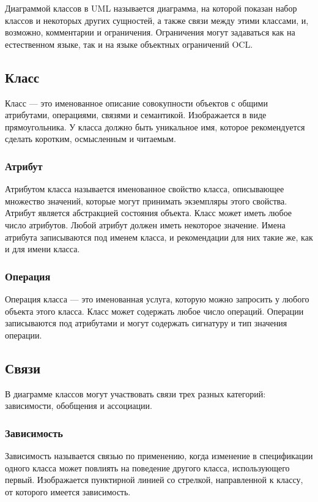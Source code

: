 \documentclass[a4paper,12pt]{article}
\begin{document}
Диаграммой классов в UML называется диаграмма, на которой показан набор классов и некоторых других сущностей, а также связи между этими классами, и, возможно, комментарии и ограничения. Ограничения могут задаваться как на естественном языке, так и на языке объектных ограничений OCL.

\subsection{Класс}

Класс — это именованное описание совокупности объектов с общими атрибутами, операциями, связями и семантикой. Изображается в виде прямоугольника. У класса должно быть уникальное имя, которое рекомендуется сделать коротким, осмысленным и читаемым.

\subsubsection{Атрибут}

Атрибутом класса называется именованное свойство класса, описывающее множество значений, которые могут принимать экземпляры этого свойства. Атрибут является абстракцией состояния объекта. Класс может иметь любое число атрибутов. Любой атрибут должен иметь некоторое значение. Имена атрибута записываются под именем класса, и рекомендации для них такие же, как и для имени класса.

\subsubsection{Операция}

Операция класса — это именованная услуга, которую можно запросить у любого объекта этого класса. Класс может содержать любое число операций. Операции записываются под атрибутами и могут содержать сигнатуру и тип значения операции.

\subsection{Связи}

В диаграмме классов могут участвовать связи трех разных категорий: зависимости, обобщения и ассоциации.

\subsubsection{Зависимость}

Зависимость называется связью по применению, когда изменение в спецификации одного класса может повлиять на поведение другого класса, использующего первый. Изображается пунктирной линией со стрелкой, направленной к классу, от которого имеется зависимость.
\end{document}
